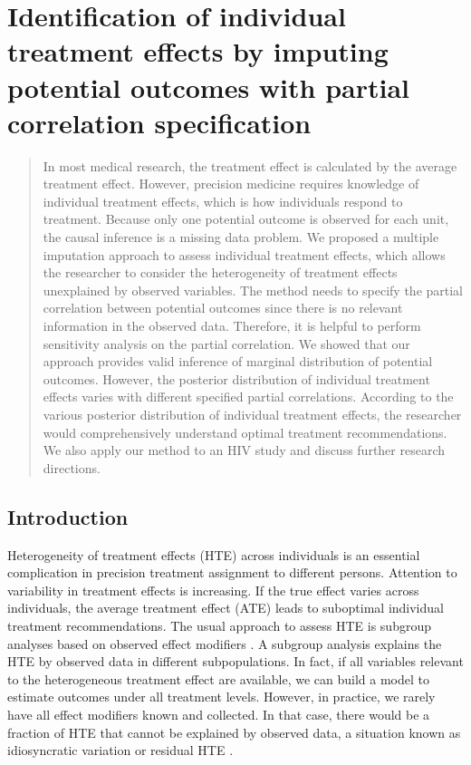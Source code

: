 \chapter{Identification of individual treatment effects by imputing potential outcomes with partial correlation specification} 
\label{chap4}
	\begin{abstract}
		In most medical research, the treatment effect is calculated by the average treatment effect. However, precision medicine requires knowledge of individual treatment effects, which is how individuals respond to treatment. Because only one potential outcome is observed for each unit, the causal inference is a missing data problem. We proposed a multiple imputation approach to assess individual treatment effects, which allows the researcher to consider the heterogeneity of treatment effects unexplained by observed variables. The method needs to specify the partial correlation between potential outcomes since there is no relevant information in the observed data. Therefore, it is helpful to perform sensitivity analysis on the partial correlation. We showed that our approach provides valid inference of marginal distribution of potential outcomes. However, the posterior distribution of individual treatment effects varies with different specified partial correlations. According to the various posterior distribution of individual treatment effects, the researcher would comprehensively understand optimal treatment recommendations. We also apply our method to an HIV study and discuss further research directions.
	\end{abstract}
	
	\section{Introduction}
	\label{sec:4.1}
	Heterogeneity of treatment effects (HTE) across individuals is an essential complication in precision treatment assignment to different persons. Attention to variability in treatment effects is increasing. If the true effect varies across individuals, the average treatment effect (ATE) leads to suboptimal individual treatment recommendations. The usual approach to assess HTE is subgroup analyses based on observed effect modifiers \citep{poulson2012treatment, zhang2013assessing}. A subgroup analysis explains the HTE by observed data in different subpopulations. In fact, if all variables relevant to the heterogeneous treatment effect are available, we can build a model to estimate outcomes under all treatment levels. However, in practice, we rarely have all effect modifiers known and collected. In that case, there would be a fraction of HTE that cannot be explained by observed data, a situation known as idiosyncratic variation \citep{ding2016randomization, heckman1997making} or residual HTE \citep{zhang2013assessing}.
	
